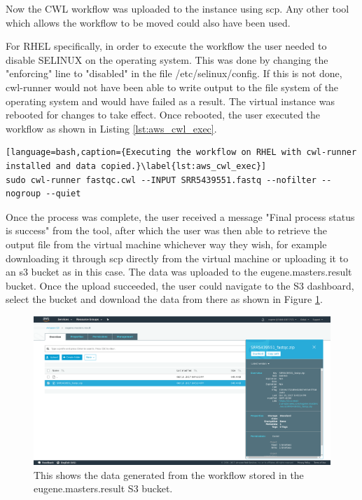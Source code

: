 Now the CWL workflow was uploaded to the instance using scp. Any other tool which allows the workflow to be moved could also have been used. 

For RHEL specifically, in order to execute the workflow the user needed to disable SELINUX on the operating system. This was done by changing the "enforcing" line to "disabled" in the file /etc/selinux/config. If this is not done, cwl-runner would not have been able to write output to the file system of the operating system and would have failed as a result. The virtual instance was rebooted for changes to take effect. Once rebooted, the user executed the workflow as shown in Listing \ref{lst:aws_cwl_exec}.

\begin{lstlisting}[language=bash,caption={Executing the workflow on RHEL with cwl-runner installed and data copied.}\label{lst:aws_cwl_exec}]
sudo cwl-runner fastqc.cwl --INPUT SRR5439551.fastq --nofilter --nogroup --quiet
\end{lstlisting}

Once the process was complete, the user received a message "Final process status is success" from the tool, after which the user was then able to retrieve the output file from the virtual machine whichever way they wish, for example downloading it through scp directly from the virtual machine or uploading it to an s3 bucket as in this case. The data was uploaded to the eugene.masters.result bucket. Once the upload succeeded, the user could navigate to the S3 dashboard, select the bucket and download the data from there as shown in Figure \ref{fig:aws_s3_result}.

\begin{figure}[h!]
\centering
\includegraphics[width=\textwidth]{Figures/4_s3_bucket_result.png}
\decoRule
\caption[AWS S3 Bucket with Result Data]{This shows the data generated from the workflow stored in the eugene.masters.result S3 bucket.}
\label{fig:aws_s3_result}
\end{figure}

